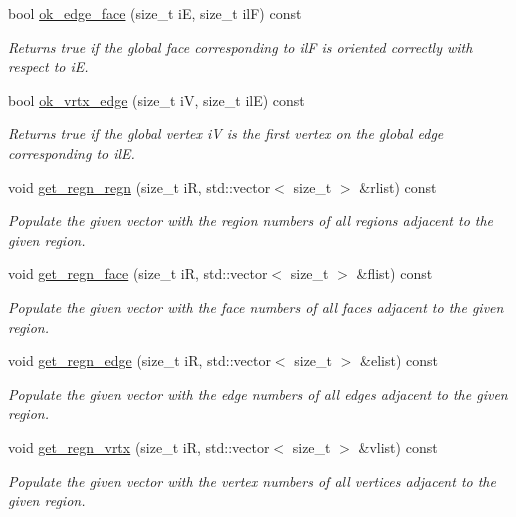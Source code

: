\begin{DoxyCompactItemize}
bool \hyperlink{classStemMesh3D_1_1mesh__3Dv_a0864ac0c5e4a946ff620caf60ba2526e}{ok\+\_\+edge\+\_\+face} (size\+\_\+t iE, size\+\_\+t ilF) const
\begin{DoxyCompactList}\small\item\em Returns true if the global face corresponding to ilF is oriented correctly with respect to iE. \end{DoxyCompactList}\item 
bool \hyperlink{classStemMesh3D_1_1mesh__3Dv_a1bcbb55c1a867e69c088f13ce09f924f}{ok\+\_\+vrtx\+\_\+edge} (size\+\_\+t iV, size\+\_\+t ilE) const
\begin{DoxyCompactList}\small\item\em Returns true if the global vertex iV is the first vertex on the global edge corresponding to ilE. \end{DoxyCompactList}\item 
void \hyperlink{classStemMesh3D_1_1mesh__3Dv_aae9d1d4fa2441cb2ac8e6a05f3e5038b}{get\+\_\+regn\+\_\+regn} (size\+\_\+t iR, std\+::vector$<$ size\+\_\+t $>$ \&rlist) const
\begin{DoxyCompactList}\small\item\em Populate the given vector with the region numbers of all regions adjacent to the given region. \end{DoxyCompactList}\item 
void \hyperlink{classStemMesh3D_1_1mesh__3Dv_a7388f79d9b639140efda17e33d169547}{get\+\_\+regn\+\_\+face} (size\+\_\+t iR, std\+::vector$<$ size\+\_\+t $>$ \&flist) const
\begin{DoxyCompactList}\small\item\em Populate the given vector with the face numbers of all faces adjacent to the given region. \end{DoxyCompactList}\item 
void \hyperlink{classStemMesh3D_1_1mesh__3Dv_a9a60d9a26cb41402390b0acc5cbd17ec}{get\+\_\+regn\+\_\+edge} (size\+\_\+t iR, std\+::vector$<$ size\+\_\+t $>$ \&elist) const
\begin{DoxyCompactList}\small\item\em Populate the given vector with the edge numbers of all edges adjacent to the given region. \end{DoxyCompactList}\item 
void \hyperlink{classStemMesh3D_1_1mesh__3Dv_a063d41ebed2be9a826b8254f38a0c7d9}{get\+\_\+regn\+\_\+vrtx} (size\+\_\+t iR, std\+::vector$<$ size\+\_\+t $>$ \&vlist) const
\begin{DoxyCompactList}\small\item\em Populate the given vector with the vertex numbers of all vertices adjacent to the given region. \end{DoxyCompactList}\item 

\end{DoxyCompactItemize}
